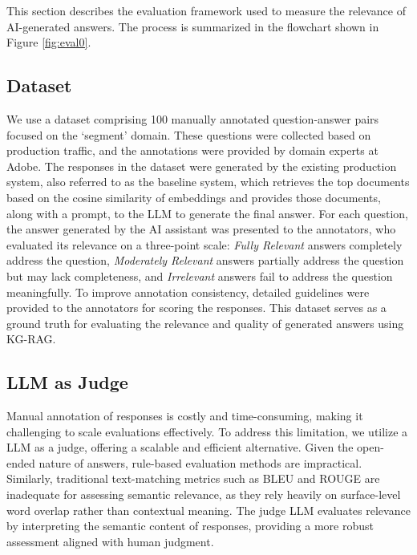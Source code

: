 This section describes the evaluation framework used to measure the relevance of AI-generated answers. The process is summarized in the flowchart shown in Figure \ref{fig:eval0}.




\subsection{Dataset}

We use a dataset comprising 100 manually annotated question-answer pairs focused on the `segment' domain. These questions were collected based on production traffic, and the annotations were provided by domain experts at Adobe. The responses in the dataset were generated by the existing production system, also referred to as the baseline system, which retrieves the top documents based on the cosine similarity of embeddings and provides those documents, along with a prompt, to the LLM to generate the final answer. For each question, the answer generated by the AI assistant was presented to the annotators, who evaluated its relevance on a three-point scale: \textit{Fully Relevant} answers completely address the question,\textit{ Moderately Relevant} answers partially address the question but may lack completeness, and \textit{Irrelevant} answers fail to address the question meaningfully. To improve annotation consistency, detailed guidelines were provided to the annotators for scoring the responses. This dataset serves as a ground truth for evaluating the relevance and quality of generated answers using KG-RAG.




\subsection{LLM as Judge}


Manual annotation of responses is costly and time-consuming, making it challenging to scale evaluations effectively. To address this limitation, we utilize a LLM as a judge, offering a scalable and efficient alternative. Given the open-ended nature of answers, rule-based evaluation methods are impractical. Similarly, traditional text-matching metrics such as BLEU\cite{papineni2002bleu} and ROUGE\cite{lin2004rouge} are inadequate for assessing semantic relevance, as they rely heavily on surface-level word overlap rather than contextual meaning. The judge LLM evaluates relevance by interpreting the semantic content of responses, providing a more robust assessment aligned with human judgment.



